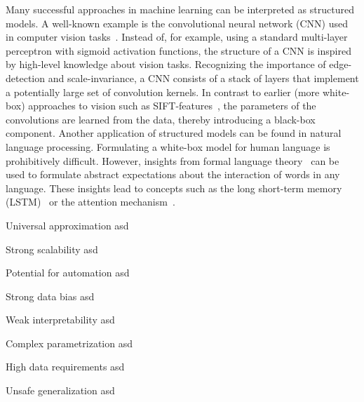Many successful approaches in machine learning can be interpreted as structured models.
A well-known example is the convolutional neural network (CNN) used in computer vision tasks~\parencite{lecun_backpropagation_1989}.
Instead of, for example, using a standard multi-layer perceptron with sigmoid activation functions, the structure of a CNN is inspired by high-level knowledge about vision tasks.
Recognizing the importance of edge-detection and scale-invariance, a CNN consists of a stack of layers that implement a potentially large set of convolution kernels.
In contrast to earlier (more white-box) approaches to vision such as SIFT-features~\parencite{lowe_object_1999}, the parameters of the convolutions are learned from the data, thereby introducing a black-box component.
Another application of structured models can be found in natural language processing.
Formulating a white-box model for human language is prohibitively difficult.
However, insights from formal language theory~\parencite{chomsky_aspects_2014} can be used to formulate abstract expectations about the interaction of words in any language.
These insights lead to concepts such as the long short-term memory (LSTM)~\parencite{hochreiter_long_1997} or the attention mechanism~\parencite{bahdanau_neural_2014,chorowski_attention-based_2015}.

\begin{Pros}
    \begin{compactdesc}
        \item[Universal approximation] asd
        \item[Strong scalability] asd
        \item[Potential for automation] asd
    \end{compactdesc}
\end{Pros}

\begin{Cons}
    \begin{compactdesc}
        \item[Strong data bias] asd
        \item[Weak interpretability] asd
        \item[Complex parametrization] asd
        \item[High data requirements] asd
        \item[Unsafe generalization] asd
    \end{compactdesc}
\end{Cons}


